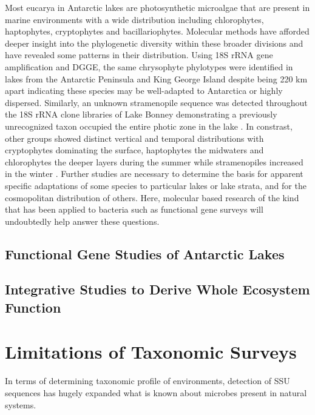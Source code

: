 Most eucarya in Antarctic lakes are photosynthetic microalgae that are present in marine environments with a wide distribution including chlorophytes, haptophytes, cryptophytes and bacillariophytes.
Molecular methods have afforded deeper insight into the phylogenetic diversity within these broader divisions and have revealed some patterns in their distribution. 
Using 18S rRNA gene amplification and DGGE, the same chrysophyte phylotypes were identified in lakes from the Antarctic Peninsula and King George Island 
despite being 220 km apart \cite{Unrein2005} indicating these species may be well-adapted to Antarctica or highly dispersed.
Similarly, an unknown stramenopile sequence was detected throughout the 18S rRNA clone libraries of Lake Bonney 
demonstrating a previously unrecognized taxon occupied the entire photic zone in the lake \cite{Bielewicz2011}. 
In constrast, other groups showed distinct vertical and temporal distributions with cryptophytes dominating the surface, 
haptophytes the midwaters and chlorophytes the deeper layers during the summer while stramenopiles increased in the winter \cite{Bielewicz2011}. 
Further studies are necessary to determine the basis for apparent specific adaptations of some species to particular lakes or lake strata, and for the cosmopolitan distribution of others.
Here, molecular based research of the kind that has been applied to bacteria such as functional gene surveys will undoubtedly help answer these questions.

\subsection{Functional Gene Studies of Antarctic Lakes}

\subsection{Integrative Studies to Derive Whole Ecosystem Function}


\section{Limitations of Taxonomic Surveys}
\label{in:pcrlimits}

In terms of determining taxonomic profile of environments, detection of SSU sequences has hugely expanded what is known about microbes present in natural systems.

